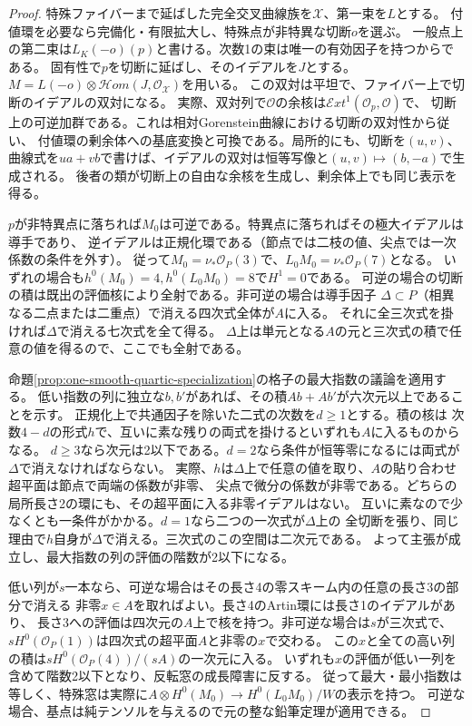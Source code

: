 \begin{proof}
特殊ファイバーまで延ばした完全交叉曲線族を$\mathcal X$、第一束を$L$とする。
付値環を必要なら完備化・有限拡大し、特殊点が非特異な切断$o$を選ぶ。
一般点上の第二束は$L_K(-o)(p)$と書ける。次数1の束は唯一の有効因子を持つからである。
固有性で$p$を切断に延ばし、そのイデアルを$J$とする。
$M=L(-o)\otimes\mathcal Hom(J,\mathcal O_{\mathcal X})$を用いる。
この双対は平坦で、ファイバー上で切断のイデアルの双対になる。
実際、双対列で$\mathcal O$の余核は$\mathcal Ext^1(\mathcal O_p,\mathcal O)$で、
切断上の可逆加群である。これは相対Gorenstein曲線における切断の双対性から従い、
付値環の剰余体への基底変換と可換である。局所的にも、切断を$(u,v)$、
曲線式を$u a+v b$で書けば、イデアルの双対は恒等写像と$(u,v)\mapsto(b,-a)$で生成される。
後者の類が切断上の自由な余核を生成し、剰余体上でも同じ表示を得る。

$p$が非特異点に落ちれば$M_0$は可逆である。特異点に落ちればその極大イデアルは導手であり、
逆イデアルは正規化環である（節点では二枝の値、尖点では一次係数の条件を外す）。
従って$M_0=\nu_*\mathcal O_P(3)$で、$L_0M_0=\nu_*\mathcal O_P(7)$となる。
いずれの場合も$h^0(M_0)=4,h^0(L_0M_0)=8$で$H^1=0$である。
可逆の場合の切断の積は既出の評価核により全射である。非可逆の場合は導手因子
$\Delta\subset P$（相異なる二点または二重点）で消える四次式全体が$A$に入る。
それに全三次式を掛ければ$\Delta$で消える七次式を全て得る。
$\Delta$上は単元となる$A$の元と三次式の積で任意の値を得るので、ここでも全射である。

命題\ref{prop:one-smooth-quartic-specialization}の格子の最大指数の議論を適用する。
低い指数の列に独立な$b,b'$があれば、その積$A b+A b'$が六次元以上であることを示す。
正規化上で共通因子を除いた二式の次数を$d\ge1$とする。積の核は
次数$4-d$の形式$h$で、互いに素な残りの両式を掛けるといずれも$A$に入るものからなる。
$d\ge3$なら次元は2以下である。$d=2$なら条件が恒等零になるには両式が$\Delta$で消えなければならない。
実際、$h$は$\Delta$上で任意の値を取り、$A$の貼り合わせ超平面は節点で両端の係数が非零、
尖点で微分の係数が非零である。どちらの局所長さ2の環にも、その超平面に入る非零イデアルはない。
互いに素なので少なくとも一条件がかかる。$d=1$なら二つの一次式が$\Delta$上の
全切断を張り、同じ理由で$h$自身が$\Delta$で消える。三次式のこの空間は二次元である。
よって主張が成立し、最大指数の列の評価の階数が2以下になる。

低い列が$s$一本なら、可逆な場合はその長さ4の零スキーム内の任意の長さ3の部分で消える
非零$x\in A$を取ればよい。長さ4のArtin環には長さ1のイデアルがあり、
長さ3への評価は四次元の$A$上で核を持つ。非可逆な場合は$s$が三次式で、
$s H^0(\mathcal O_P(1))$は四次式の超平面$A$と非零の$x$で交わる。
この$x$と全ての高い列の積は$s H^0(\mathcal O_P(4))/(sA)$の一次元に入る。
いずれも$x$の評価が低い一列を含めて階数2以下となり、反転窓の成長障害に反する。
従って最大・最小指数は等しく、特殊窓は実際に$A\otimes H^0(M_0)\to H^0(L_0M_0)/W$の表示を持つ。
可逆な場合、基点は純テンソルを与えるので元の整な鉛筆定理が適用できる。


\end{proof}
